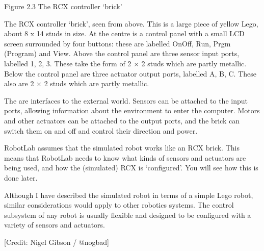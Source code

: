 \documentclass[letterpaper,10pt,english]{sphinxmanual}
\let\sphinxpxdimen\pdfpxdimen\else\newdimen\sphinxpxdimen
\begin{document}

Figure 2.3 The RCX controller ‘brick’

The RCX controller ‘brick’, seen from above. This is a large piece of yellow Lego, about 8 x 14 studs in size. At the centre is a control panel with a small LCD screen surrounded by four buttons: these are labelled On\sphinxhyphen{}Off, Run, Prgm (Program) and View. Above the control panel are three sensor input ports, labelled 1, 2, 3. These take the form of 2 × 2 studs which are partly metallic. Below the control panel are three actuator output ports, labelled A, B, C. These also are 2 × 2 studs which are
partly metallic.

The  are interfaces to the external world. Sensors can be attached to the input ports, allowing information about the environment to enter the computer. Motors and other actuators can be attached to the output ports, and the brick can switch them on and off and control their direction and power.

RobotLab assumes that the simulated robot works like an RCX brick. This means that RobotLab needs to know what kinds of sensors and actuators are being used, and how the (simulated) RCX is ‘configured’. You will see how this is done later.

Although I have described the simulated robot in terms of a simple Lego robot, similar considerations would apply to other robotics systems. The control subsystem of any robot is usually flexible and designed to be configured with a variety of sensors and actuators.

\sphinxincludegraphics[width=4608\sphinxpxdimen,height=2592\sphinxpxdimen]{{nogbad_ev3}.jpg}

{[}Credit: Nigel Gibson / @nogbad{]}
\end{document}
